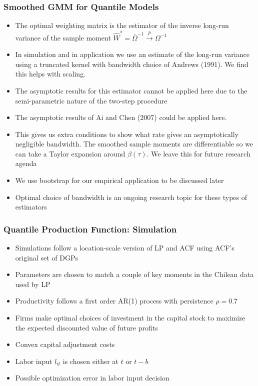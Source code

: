 \documentclass{beamer}
\begin{document}

\begin{frame}
\frametitle{Smoothed GMM for Quantile Models}
\begin{itemize}
	\item The optimal weighting matrix is the estimator of the inverse long-run variance of the sample moment $\hat{W}^{*}=\bar{\Omega}^{-1}\overset{p}{\to}\Omega^{-1}$
	\item In simulation and in application we use an estimate of the long-run variance using a truncated kernel with bandwidth choice of Andrews (1991). We find this helps with scaling.
	\item The asymptotic results for this estimator cannot be applied here due to the semi-parametric nature of the two-step procedure
	\item The asymptotic results of Ai and Chen (2007) could be applied here. 
	\item This gives us extra conditions to show what rate gives an asymptotically negligible bandwidth. The smoothed sample moments are differentiable so we can take a Taylor expansion around $\beta(\tau)$. We leave this for future research agenda
	\item We use bootstrap for our empirical application to be discussed later
	\item Optimal choice of bandwidth is an ongoing research topic for these types of estimators
\end{itemize}
\end{frame}


\begin{frame}
\frametitle{Quantile Production Function: Simulation}
\begin{itemize}
	\item Simulations follow a location-scale version of LP and ACF using ACF's original set of DGPs 
	\item Parameters are chosen to match a couple of key moments in the Chilean data used by LP
	\item Productivity follows a first order AR(1) process with persistence $\rho=0.7$
	\item Firms make optimal choices of investment in the capital stock to maximize the expected discounted value of future profits
	\item Convex capital adjustment costs
	\item Labor input $l_{it}$ is chosen either at $t$ or $t-b$
	\item Possible optimization error in labor input decision
\end{itemize}
\end{frame}
\end{document}
